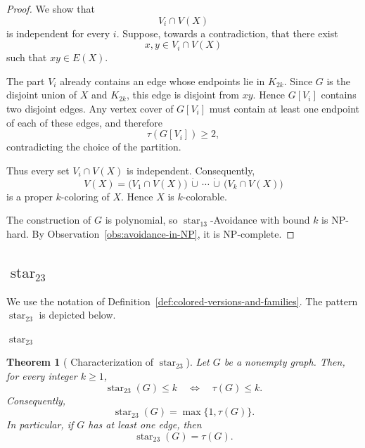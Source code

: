 \documentclass[12pt]{article}
\theoremstyle{plain}
\newtheorem{theorem}{Theorem}[section]
\theoremstyle{definition}
\theoremstyle{remark}
\theoremstyle{definition}
\newcommand{\starlabel}{\mathrm{star}}
\DeclareRobustCommand{\starparam}[1]{%
  \ensuremath{\mathop{\starlabel}\nolimits_{#1}}%
}
\begin{document}
\begin{proof}
We show that
\[
V_i\cap V(X)
\]
is independent for every \(i\). Suppose, towards a contradiction, that
there exist
\[
x,y\in V_i\cap V(X)
\]
such that \(xy\in E(X)\).

The part \(V_i\) already contains an edge whose endpoints lie in
\(K_{2k}\). Since \(G\) is the disjoint union of \(X\) and \(K_{2k}\),
this edge is disjoint from \(xy\). Hence \(G[V_i]\) contains two disjoint
edges. Any vertex cover of \(G[V_i]\) must contain at least one endpoint
of each of these edges, and therefore
\[
\tau(G[V_i])\ge2,
\]
contradicting the choice of the partition.

Thus every set \(V_i\cap V(X)\) is independent. Consequently,
\[
V(X)
=
\bigl(V_1\cap V(X)\bigr)
\,\dot\cup\,\cdots\,\dot\cup\,
\bigl(V_k\cap V(X)\bigr)
\]
is a proper \(k\)-coloring of \(X\). Hence \(X\) is \(k\)-colorable.

The construction of \(G\) is polynomial, so
\(\starparam{13}\)-Avoidance with bound \(k\) is NP-hard. By
Observation~\ref{obs:avoidance-in-NP}, it is NP-complete.
\end{proof}




\subsection{\texorpdfstring{\(\starparam{23}\)}{star23}}
\label{subsec:star23}

We use the notation of
Definition~\ref{def:colored-versions-and-families}.
The pattern \(\starparam{23}\) is depicted below.

\begin{center}

\smallskip
\(\starparam{23}\)
\end{center}



\begin{theorem}[
Characterization of
\texorpdfstring{\(\starparam{23}\)}{star23}
]
\label{thm:star23-vertex-cover}
Let \(G\) be a nonempty graph. Then, for every integer \(k\ge 1\),
\[
\starparam{23}(G)\le k
\quad\Longleftrightarrow\quad
\tau(G)\le k.
\]
Consequently,
\[
\starparam{23}(G)=\max\{1,\tau(G)\}.
\]
In particular, if \(G\) has at least one edge, then
\[
\starparam{23}(G)=\tau(G).
\]
\end{theorem}
\end{document}
